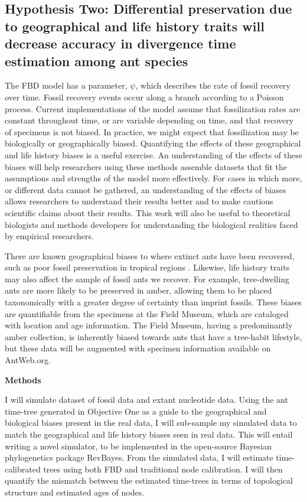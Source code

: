 \documentclass[]{article}
\begin{document}
\subsection*{Hypothesis Two: Differential preservation due to geographical and life history traits will decrease accuracy in divergence time estimation among ant species}
The FBD model has a parameter, $\psi$, which describes the rate of fossil recovery over time. Fossil recovery events occur along a branch according to a Poisson process. Current implementations of the model assume that fossilization rates are constant throughout time, or are variable depending on time, and that recovery of specimens is not biased. In practice, we might expect that fossilization may be biologically or geographically biased. Quantifying the effects of these geographical and life history biases is a useful exercise. An understanding of the effects of these biases will help researchers using these methods assemble datasets that fit the assumptions and strengths of the model more effectively. For cases in which more, or different data cannot be gathered, an understanding of the effects of biases allows researchers to understand their results better and to make cautious scientific claims about their results. This work will also be useful to theoretical biologists and methods developers for understanding the biological realities faced by empirical researchers. \par

There are known geographical biases to where extinct ants have been recovered, such as poor fossil preservation in tropical regions \citep{ref76}. Likewise, life history traits may also affect the sample of fossil ants we recover. For example, tree-dwelling ants are more likely to be preserved in amber, allowing them to be placed taxonomically with a greater degree of certainty than imprint fossils. These biases are quantifiable from the specimens at the Field Museum, which are cataloged with location and age information. The Field Museum, having a predominantly amber collection, is inherently biased towards ants that have a tree-habit lifestyle, but these data will be augmented with specimen information available on AntWeb.org. \par
	
\textbf{Methods} \par
I will simulate  dataset of fossil data and extant nucleotide data. Using the ant time-tree generated in Objective One as a guide to the geographical and biological biases present in the real data, I will sub-sample my simulated data to match the geographical and life history biases seen in real data. This will entail writing a novel simulator, to be implemented in the open-source Bayesian phylogenetics package RevBayes. From the simulated data, I will estimate time-calibrated trees using both FBD and traditional node calibration. I will then quantify the mismatch between the estimated time-trees in terms of topological structure and estimated ages of nodes. 
\end{document}
